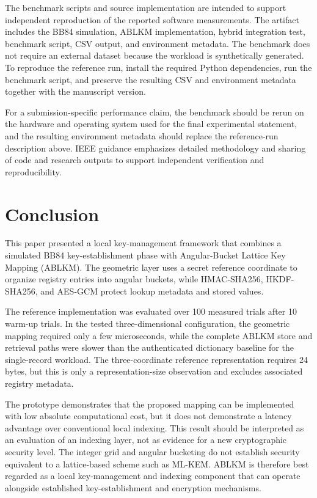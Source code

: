 \documentclass[journal,twocolumn]{IEEEtran}
\begin{document}
The benchmark scripts and source implementation are intended to support independent reproduction of the reported software measurements. The artifact includes the BB84 simulation, ABLKM implementation, hybrid integration test, benchmark script, CSV output, and environment metadata. The benchmark does not require an external dataset because the workload is synthetically generated. To reproduce the reference run, install the required Python dependencies, run the benchmark script, and preserve the resulting CSV and environment metadata together with the manuscript version.

For a submission-specific performance claim, the benchmark should be rerun on the hardware and operating system used for the final experimental statement, and the resulting environment metadata should replace the reference-run description above. IEEE guidance emphasizes detailed methodology and sharing of code and research outputs to support independent verification and reproducibility.

\section{Conclusion}

This paper presented a local key-management framework that combines a simulated BB84 key-establishment phase with Angular-Bucket Lattice Key Mapping (ABLKM). The geometric layer uses a secret reference coordinate to organize registry entries into angular buckets, while HMAC-SHA256, HKDF-SHA256, and AES-GCM protect lookup metadata and stored values.

The reference implementation was evaluated over 100 measured trials after 10 warm-up trials. In the tested three-dimensional configuration, the geometric mapping required only a few microseconds, while the complete ABLKM store and retrieval paths were slower than the authenticated dictionary baseline for the single-record workload. The three-coordinate reference representation requires 24 bytes, but this is only a representation-size observation and excludes associated registry metadata.

The prototype demonstrates that the proposed mapping can be implemented with low absolute computational cost, but it does not demonstrate a latency advantage over conventional local indexing. This result should be interpreted as an evaluation of an indexing layer, not as evidence for a new cryptographic security level. The integer grid and angular bucketing do not establish security equivalent to a lattice-based scheme such as ML-KEM. ABLKM is therefore best regarded as a local key-management and indexing component that can operate alongside established key-establishment and encryption mechanisms.
\end{document}
